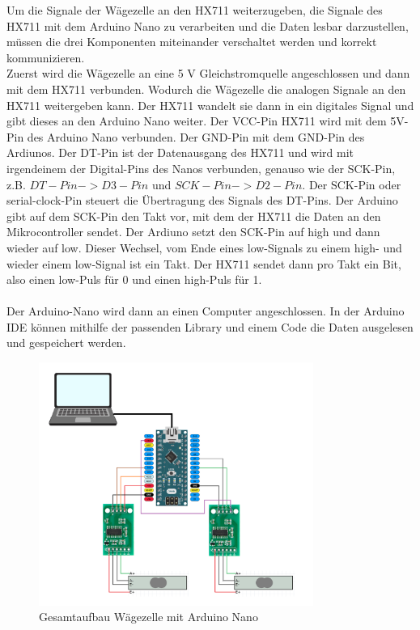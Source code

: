 Um die Signale der Wägezelle an den HX711 weiterzugeben, die Signale des HX711 mit dem Arduino Nano zu verarbeiten und die Daten lesbar darzustellen, müssen die drei Komponenten miteinander verschaltet werden und korrekt kommunizieren.
\\
Zuerst wird die Wägezelle an eine 5 V Gleichstromquelle angeschlossen und dann mit dem HX711 verbunden. Wodurch die Wägezelle die analogen Signale an den HX711 weitergeben kann. Der HX711 wandelt sie dann in ein digitales Signal und gibt dieses an den Arduino Nano weiter. Der VCC-Pin HX711 wird mit dem 5V-Pin des Arduino Nano verbunden. Der GND-Pin mit dem GND-Pin des Ardiunos. Der DT-Pin ist der Datenausgang des HX711 und wird mit irgendeinem der Digital-Pins des Nanos verbunden, genauso wie der SCK-Pin, z.B. $DT-Pin -> D3-Pin$ und $SCK-Pin -> D2-Pin$. Der SCK-Pin oder serial-clock-Pin steuert die Übertragung des Signals des DT-Pins. Der Arduino gibt auf dem SCK-Pin den Takt vor, mit dem der HX711 die Daten an den Mikrocontroller sendet. Der Ardiuno setzt den SCK-Pin auf high und dann wieder auf low. Dieser Wechsel, vom Ende eines low-Signals zu einem high- und wieder einem low-Signal ist ein Takt. Der HX711 sendet dann pro Takt ein Bit, also einen low-Puls für 0 und einen high-Puls für 1.
\\
\\
Der Arduino-Nano wird dann an einen Computer angeschlossen.
In der Arduino IDE können mithilfe der passenden Library und einem Code die Daten ausgelesen und gespeichert werden.
\begin{figure}[h!]
    \centering
    \includegraphics[width=0.8\textwidth]{img/Schaltungs-Aufbau.png}
    \caption{Gesamtaufbau Wägezelle mit Arduino Nano}
    \label{Gesamtaufbau-waegezelle-mit-Arduino-Nano}
\end{figure}
